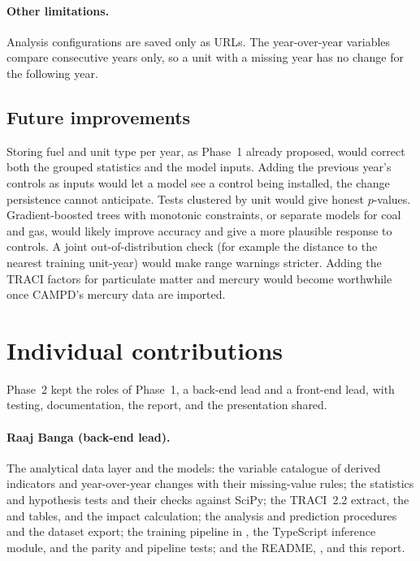 \documentclass[11pt,a4paper]{article}
\begin{document}
\paragraph{Other limitations.} Analysis configurations are saved only as URLs. The year-over-year
variables compare consecutive years only, so a unit with a missing year has no change for the
following year.

\subsection{Future improvements}

Storing fuel and unit type per year, as Phase~1 already proposed, would correct both the grouped
statistics and the model inputs. Adding the previous year's controls as inputs would let a model
see a control being installed, the change persistence cannot anticipate. Tests clustered by unit would give honest $p$-values.
Gradient-boosted trees with monotonic constraints, or separate models for coal and gas, would
likely improve accuracy and give a more plausible response to controls. A joint
out-of-distribution check (for example the distance to the nearest training unit-year) would
make range warnings stricter. Adding the TRACI factors for particulate matter and mercury would
become worthwhile once CAMPD's mercury data are imported.

\section{Individual contributions}
\label{sec:contributions}

Phase~2 kept the roles of Phase~1, a back-end lead and a front-end lead, with testing,
documentation, the report, and the presentation shared.

\paragraph{Raaj Banga (back-end lead).} The analytical data layer and the models: the variable
catalogue of derived indicators and year-over-year changes with their missing-value rules; the
statistics and hypothesis tests and their checks against SciPy; the TRACI~2.2 extract, the
 and  tables, and the impact calculation; the analysis and
prediction procedures and the dataset export; the training pipeline in , the
TypeScript inference module, and the parity and pipeline tests; and the README,
, and this report.
\end{document}
